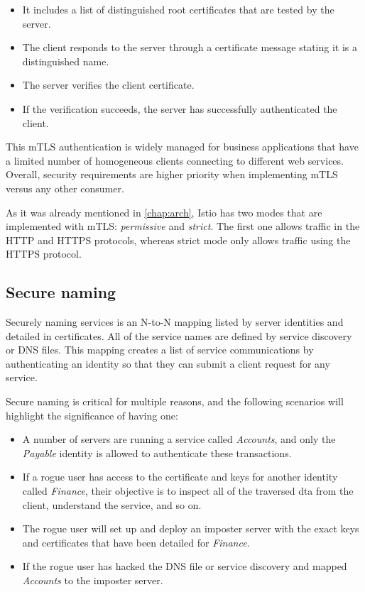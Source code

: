 \begin{itemize}
    \item It includes a list of distinguished root certificates that are tested by the server.
    \item The client responds to the server through a certificate message stating it is a distinguished name.
    \item The server verifies the client certificate.
    \item If the verification succeeds, the server has successfully authenticated the client.
\end{itemize}

This mTLS authentication is widely managed for business applications that have a limited number of homogeneous clients connecting to different web services. Overall, security requirements are higher priority when implementing mTLS versus any other consumer.

As it was already mentioned in \ref{chap:arch}, Istio has two modes that are implemented with mTLS: \textit{permissive} and \textit{strict}. The first one allows traffic in the HTTP and HTTPS protocols, whereas strict mode only allows traffic using the HTTPS protocol.

\subsection{Secure naming}
Securely naming services is an N-to-N mapping listed by server identities and detailed in certificates. All of the service names are defined by service discovery or DNS files. This mapping creates a list of service communications by authenticating an identity so that they can submit a client request for any service.

Secure naming is critical for multiple reasons, and the following scenarios will highlight the significance of having one:

\begin{itemize}
    \item A number of servers are running a service called \textit{Accounts}, and only the \textit{Payable} identity is allowed to authenticate these transactions.
    \item If a rogue user has access to the certificate and keys for another identity called \textit{Finance}, their objective is to inspect all of the traversed dta from the client, understand the service, and so on.
    \item The rogue user will set up and deploy an imposter server with the exact keys and certificates that have been detailed for \textit{Finance}.
    \item If the rogue user has hacked the DNS file or service discovery and mapped \textit{Accounts} to the imposter server.
\end{itemize}

